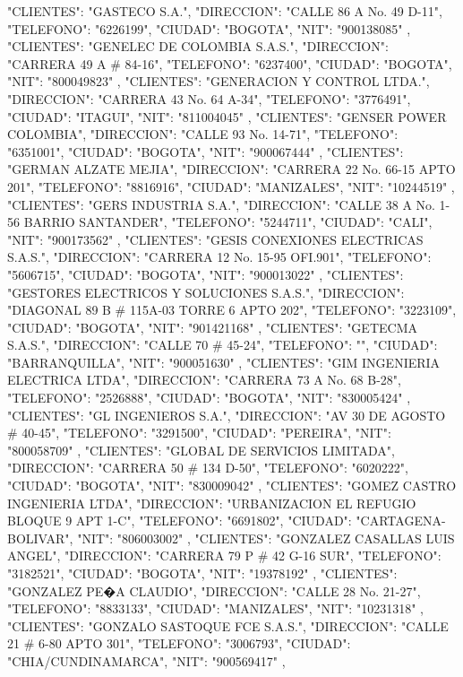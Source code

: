    {
   "CLIENTES": "GASTECO S.A.",
   "DIRECCION": "CALLE 86 A No. 49 D-11",
   "TELEFONO": "6226199",
   "CIUDAD": "BOGOTA",
   "NIT": "900138085"
   },
   {
   "CLIENTES": "GENELEC DE COLOMBIA S.A.S.",
   "DIRECCION": "CARRERA 49 A # 84-16",
   "TELEFONO": "6237400",
   "CIUDAD": "BOGOTA",
   "NIT": "800049823"
   },
   {
   "CLIENTES": "GENERACION Y CONTROL LTDA.",
   "DIRECCION": "CARRERA 43 No. 64 A-34",
   "TELEFONO": "3776491",
   "CIUDAD": "ITAGUI",
   "NIT": "811004045"
   },
   {
   "CLIENTES": "GENSER POWER COLOMBIA",
   "DIRECCION": "CALLE 93 No. 14-71",
   "TELEFONO": "6351001",
   "CIUDAD": "BOGOTA",
   "NIT": "900067444"
   },
   {
   "CLIENTES": "GERMAN ALZATE MEJIA",
   "DIRECCION": "CARRERA 22 No. 66-15 APTO 201",
   "TELEFONO": "8816916",
   "CIUDAD": "MANIZALES",
   "NIT": "10244519"
   },
   {
   "CLIENTES": "GERS INDUSTRIA S.A.",
   "DIRECCION": "CALLE 38 A No. 1-56 BARRIO SANTANDER",
   "TELEFONO": "5244711",
   "CIUDAD": "CALI",
   "NIT": "900173562"
   },
   {
   "CLIENTES": "GESIS CONEXIONES ELECTRICAS S.A.S.",
   "DIRECCION": "CARRERA 12 No. 15-95 OFI.901",
   "TELEFONO": "5606715",
   "CIUDAD": "BOGOTA",
   "NIT": "900013022"
   },
   {
   "CLIENTES": "GESTORES ELECTRICOS Y SOLUCIONES S.A.S.",
   "DIRECCION": "DIAGONAL 89 B # 115A-03 TORRE 6 APTO 202",
   "TELEFONO": "3223109",
   "CIUDAD": "BOGOTA",
   "NIT": "901421168"
   },
   {
   "CLIENTES": "GETECMA S.A.S.",
   "DIRECCION": "CALLE 70 # 45-24",
   "TELEFONO": "",
   "CIUDAD": "BARRANQUILLA",
   "NIT": "900051630"
   },
   {
   "CLIENTES": "GIM INGENIERIA ELECTRICA LTDA",
   "DIRECCION": "CARRERA 73 A No. 68 B-28",
   "TELEFONO": "2526888",
   "CIUDAD": "BOGOTA",
   "NIT": "830005424"
   },
   {
   "CLIENTES": "GL INGENIEROS S.A.",
   "DIRECCION": "AV 30 DE AGOSTO # 40-45",
   "TELEFONO": "3291500",
   "CIUDAD": "PEREIRA",
   "NIT": "800058709"
   },
   {
   "CLIENTES": "GLOBAL DE SERVICIOS LIMITADA",
   "DIRECCION": "CARRERA 50 # 134 D-50",
   "TELEFONO": "6020222",
   "CIUDAD": "BOGOTA",
   "NIT": "830009042"
   },
   {
   "CLIENTES": "GOMEZ CASTRO INGENIERIA LTDA",
   "DIRECCION": "URBANIZACION EL REFUGIO BLOQUE 9 APT 1-C",
   "TELEFONO": "6691802",
   "CIUDAD": "CARTAGENA-BOLIVAR",
   "NIT": "806003002"
   },
   {
   "CLIENTES": "GONZALEZ CASALLAS LUIS ANGEL",
   "DIRECCION": "CARRERA 79 P # 42 G-16 SUR",
   "TELEFONO": "3182521",
   "CIUDAD": "BOGOTA",
   "NIT": "19378192"
   },
   {
   "CLIENTES": "GONZALEZ PE�A CLAUDIO",
   "DIRECCION": "CALLE 28 No. 21-27",
   "TELEFONO": "8833133",
   "CIUDAD": "MANIZALES",
   "NIT": "10231318"
   },
   {
   "CLIENTES": "GONZALO SASTOQUE FCE S.A.S.",
   "DIRECCION": "CALLE 21 # 6-80 APTO 301",
   "TELEFONO": "3006793",
   "CIUDAD": "CHIA/CUNDINAMARCA",
   "NIT": "900569417"
   },
